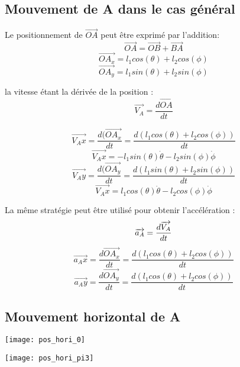 \documentclass{udes_rapport} %
\begin{document}
\subsection{Mouvement de A dans le cas général}
Le positionnement de $\overrightarrow{OA}$ peut être exprimé par l'addition:
\begin{equation}
	\overrightarrow{OA} = \overrightarrow{OB} + \overrightarrow{BA}
\end{equation}
	\[	\overrightarrow{OA_x} = l_1 cos(\theta) + l_2 cos(\phi) 			\]
	\[	\overrightarrow{OA_y} = l_1 sin(\theta) + l_2 sin(\phi)			\]


la vitesse étant la dérivée de la position :
\begin{equation}
\overrightarrow{V_A} = \frac{d\overrightarrow{OA}}{dt}
\end{equation}

\[ \overrightarrow{V_Ax} = \frac{d(\overrightarrow{OA_x}}{dt} = \frac{d(l_1 cos(\theta) + l_2 cos(\phi))}{dt}	\]
\[ \overrightarrow{V_Ax} = -l_1 sin(\theta) \dot{\theta} -l_2 sin(\phi) \dot{\phi}								\]
\[ \overrightarrow{V_Ay} = \frac{d(\overrightarrow{OA_y}}{dt} = \frac{d(l_1 sin(\theta) + l_2 sin(\phi))}{dt}	\]
\[ \overrightarrow{V_Ax} = l_1 cos(\theta) \dot{\theta} -l_2 cos(\phi) \dot{\phi}								\]


La même stratégie peut être utilisé pour obtenir l'accélération :
\begin{equation}
\overrightarrow{a_A} = \frac{d\overrightarrow{V_A}}{dt}	\\
\end{equation}
\[	\overrightarrow{a_Ax} = \frac{d\overrightarrow{OA_x}}{dt} = \frac{ d(l_1 cos(\theta) + l_2 cos(\phi))}{dt}		\]
\[	\overrightarrow{a_Ay} = \frac{d\overrightarrow{OA_y}}{dt} = \frac{d(l_1 cos(\theta) + l_2 cos(\phi))}{dt}		\]

\subsection{Mouvement horizontal de A}

\noindent\begin{minipage}{\textwidth} 
\begin{minipage}{0.5\textwidth}
  \centering
  \texttt{[image: pos\_hori\_0]}
  \label{pos_hori:position_horizontal_initiale}
\end{minipage}%
\begin{minipage}{0.5\textwidth}
  \centering 
  \texttt{[image: pos\_hori\_pi3]} 
  \label{pos_hori:position_horizontal_finale} 
\end{minipage} 
\label{pos_hori} 
\end{minipage}
\end{document}
